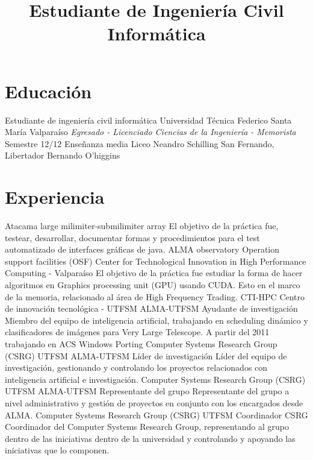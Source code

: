 \documentclass[11pt,a4paper]{moderncv}
\title{Estudiante de Ingeniería Civil Informática}
\begin{document}
\maketitle

\section{Educación}
	{Estudiante de ingeniería civil informática}
	{Universidad Técnica Federico Santa María}
	{Valparaíso}
	{\emph{Egresado - Licenciado Ciencias de la Ingeniería - Memorista}}
	{Semestre 12/12}
	{Enseñanza media}
	{Liceo Neandro Schilling}
	{San Fernando, Libertador Bernando O'higgins}
	{}{}

\section{Experiencia}
	{Atacama large milimiter-submilimiter array}
	{El objetivo de la práctica fue, testear, desarrollar, documentar formas y procedimientos para el test automatizado de 
	interfaces gráficas de java.}
	{ALMA observatory}
	{Operation support facilities (OSF)}
	{}
	{Center for Technological Innovation in High Performance Computing - Valparaíso}
	{El objetivo de la práctica fue estudiar la forma de hacer algoritmos en Graphics processing unit (GPU) usando CUDA. Esto en el marco
	de la memoria, relacionado al área de High Frequency Trading.}
	{CTI-HPC}
	{Centro de innovación tecnológica - UTFSM}
	{}
	{ALMA-UTFSM Ayudante de investigación}
	{Miembro del equipo de inteligencia artificial, trabajando en scheduling dinámico y clasificadores de imágenes para Very Large Telescope. 
		A partir del 2011 trabajando en ACS Windows Porting}
	{Computer Systems Research Group (CSRG)}
	{UTFSM}
	{}
	{ALMA-UTFSM Líder de investigación}
	{Líder del equipo de investigación, gestionando y controlando los proyectos relacionados con inteligencia artificial e investigación.}
	{Computer Systems Research Group (CSRG)}
	{UTFSM}
	{}
	{ALMA-UTFSM Representante del grupo}
	{Representante del grupo a nivel administrativo y gestión de proyectos en conjunto con los encargados desde ALMA.}
	{Computer Systems Research Group (CSRG)}
	{UTFSM}
	{}
	{Coordinador CSRG}
	{Coordinador del Computer Systems Research Group, representando al grupo dentro de las iniciativas dentro de la universidad
		y controlando y apoyando las iniciativas que lo componen.}
\end{document}
